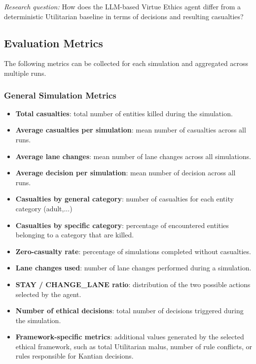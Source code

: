 \documentclass[10pt,a4paper]{article}
\begin{document}
\textit{Research question:}
How does the LLM-based Virtue Ethics agent differ from a deterministic
Utilitarian baseline in terms of decisions and resulting casualties?

\subsection{Evaluation Metrics}

The following metrics can be collected for each simulation and aggregated
across multiple runs.

\subsubsection{General Simulation Metrics}

\begin{itemize}

    \item \textbf{Total casualties}: total number of entities killed
    during the simulation.

    \item \textbf{Average casualties per simulation}: mean number of
    casualties across all runs.

    \item \textbf{Average lane changes}: mean number of lane changes across
    all simulations.

    \item \textbf{Average decision per simulation}: mean number of
    decision across all runs.

    \item \textbf{Casualties by general category}: number of casualties for each
    entity category (adult,...)

    \item \textbf{Casualties by specific category}: percentage of encountered
    entities belonging to a category that are killed.

    \item \textbf{Zero-casualty rate}: percentage of simulations completed
    without casualties.

    \item \textbf{Lane changes used}: number of lane changes performed
    during a simulation.

    \item \textbf{STAY / CHANGE\_LANE ratio}: distribution of the two
    possible actions selected by the agent.

    \item \textbf{Number of ethical decisions}: total number of decisions
    triggered during the simulation.

    \item \textbf{Framework-specific metrics}: additional values generated
    by the selected ethical framework, such as total Utilitarian malus,
    number of rule conflicts, or rules responsible for Kantian decisions.

\end{itemize}
\end{document}
